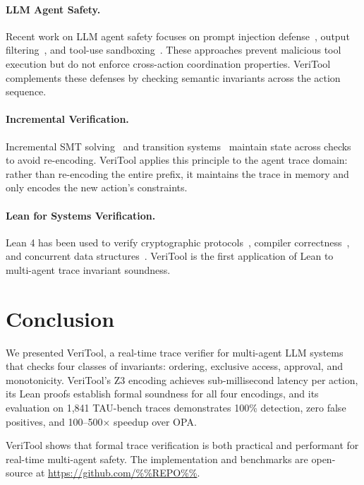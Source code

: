 \documentclass[10pt,twocolumn]{article}
\begin{document}
\paragraph{LLM Agent Safety.}
Recent work on LLM agent safety focuses on prompt injection
defense~\cite{prompt-injection}, output filtering~\cite{output-guard},
and tool-use sandboxing~\cite{tool-sandbox}. These approaches prevent
malicious tool execution but do not enforce cross-action coordination
properties. VeriTool complements these defenses by checking semantic
invariants across the action sequence.

\paragraph{Incremental Verification.}
Incremental SMT solving~\cite{incremental-smt} and transition
systems~\cite{model-checking} maintain state across checks to avoid
re-encoding. VeriTool applies this principle to the agent trace domain:
rather than re-encoding the entire prefix, it maintains the trace
in memory and only encodes the new action's constraints.

\paragraph{Lean for Systems Verification.}
Lean 4 has been used to verify cryptographic protocols~\cite{lean-crypto},
compiler correctness~\cite{lean-compiler}, and concurrent data
structures~\cite{lean-concurrent}. VeriTool is the first application
of Lean to multi-agent trace invariant soundness.

\section{Conclusion}

We presented VeriTool, a real-time trace verifier for multi-agent LLM
systems that checks four classes of invariants: ordering, exclusive
access, approval, and monotonicity. VeriTool's Z3 encoding achieves
sub-millisecond latency per action, its Lean proofs establish formal
soundness for all four encodings, and its evaluation on 1,841 TAU-bench
traces demonstrates 100\% detection, zero false positives, and
100--500$\times$ speedup over OPA.

VeriTool shows that formal trace verification is both practical and
performant for real-time multi-agent safety. The implementation and
benchmarks are open-source at \url{https://github.com/%%REPO%%}.
\end{document}

